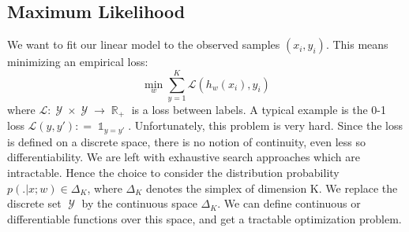 \documentclass{article}
\DeclareMathOperator{\R}{\mathbb{R}}
\DeclareMathOperator{\1}{\mathbb{1}}
\DeclareMathOperator{\Y}{\mathcal{Y}}
\begin{document}
 \subsection{Maximum Likelihood}

We want to fit our linear model to the observed samples $(x_i, y_i)$.
This means minimizing an empirical loss:
\begin{equation}
	\min_w \sum_{y=1}^K \mathcal L (h_w(x_i),y_i)
\end{equation}
where $\mathcal L: \Y \times \Y \rightarrow \R_+$ is a loss between labels.
A typical example is the 0-1 loss $\mathcal L(y, y') : = \1_{y=y'}$.
Unfortunately, this problem is very hard.
Since the loss is defined on a discrete space, there is no notion of continuity, even less so differentiability.
We are left with exhaustive search approaches which are intractable.
Hence the choice to consider the distribution probability $p( . | x ; w) \in \Delta_K$, where $\Delta_K$ denotes the simplex of dimension K.
We replace the discrete set $\Y$ by the continuous space $\Delta_K$.
We can define continuous or differentiable functions over this space, and get a tractable optimization problem.
 
\end{document}
